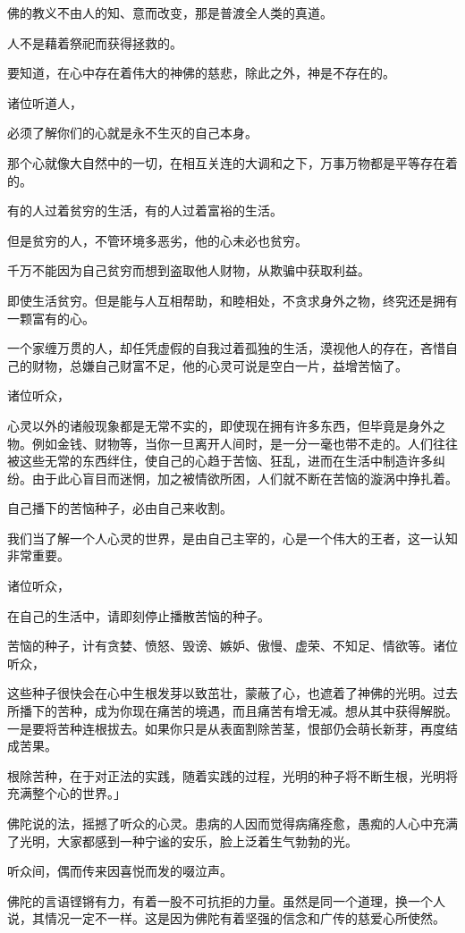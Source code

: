 \documentclass[twoside,openany]{book}
\begin{document}
佛的教义不由人的知、意而改变，那是普渡全人类的真道。

人不是藉着祭祀而获得拯救的。

要知道，在心中存在着伟大的神佛的慈悲，除此之外，神是不存在的。

诸位听道人，

必须了解你们的心就是永不生灭的自己本身。

那个心就像大自然中的一切，在相互关连的大调和之下，万事万物都是平等存在着的。

有的人过着贫穷的生活，有的人过着富裕的生活。

但是贫穷的人，不管环境多恶劣，他的心未必也贫穷。

千万不能因为自己贫穷而想到盗取他人财物，从欺骗中获取利益。

即使生活贫穷。但是能与人互相帮助，和睦相处，不贪求身外之物，终究还是拥有一颗富有的心。

一个家缠万贯的人，却任凭虚假的自我过着孤独的生活，漠视他人的存在，吝惜自己的财物，总嫌自己财富不足，他的心灵可说是空白一片，益增苦恼了。

诸位听众，

心灵以外的诸般现象都是无常不实的，即使现在拥有许多东西，但毕竟是身外之物。例如金钱、财物等，当你一旦离开人间时，是一分一毫也带不走的。人们往往被这些无常的东西绊住，使自己的心趋于苦恼、狂乱，进而在生活中制造许多纠纷。由于此心盲目而迷惘，加之被情欲所困，人们就不断在苦恼的漩涡中挣扎着。

自己播下的苦恼种子，必由自己来收割。

我们当了解一个人心灵的世界，是由自己主宰的，心是一个伟大的王者，这一认知非常重要。

诸位听众，

在自己的生活中，请即刻停止播散苦恼的种子。

苦恼的种子，计有贪婪、愤怒、毁谤、嫉妒、傲慢、虚荣、不知足、情欲等。诸位听众，

这些种子很快会在心中生根发芽以致茁壮，蒙蔽了心，也遮着了神佛的光明。过去所播下的苦种，成为你现在痛苦的境遇，而且痛苦有增无减。想从其中获得解脱。一是要将苦种连根拔去。如果你只是从表面割除苦茎，恨部仍会萌长新芽，再度结成苦果。

根除苦种，在于对正法的实践，随着实践的过程，光明的种子将不断生根，光明将充满整个心的世界。」

佛陀说的法，摇撼了听众的心灵。患病的人因而觉得病痛痊愈，愚痴的人心中充满了光明，大家都感到一种宁谧的安乐，脸上泛着生气勃勃的光。

听众间，偶而传来因喜悦而发的啜泣声。

佛陀的言语铿锵有力，有着一股不可抗拒的力量。虽然是同一个道理，换一个人说，其情况一定不一样。这是因为佛陀有着坚强的信念和广传的慈爱心所使然。
\end{document}
